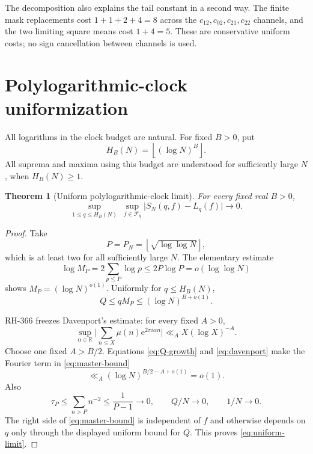 \documentclass[11pt]{article}
\newtheorem{theorem}{Theorem}[section]
\theoremstyle{definition}
\theoremstyle{remark}
\newcommand{\mob}{\mu}
\newcommand{\Fcal}{\mathcal F}
\newcommand{\e}{\mathrm e}
\newcommand{\abs}[1]{\lvert#1\rvert}
\begin{document}
The decomposition also explains the tail constant in a second way.  The
finite mask replacements cost $1+1+2+4=8$ across the
$c_{12},c_{02},c_{21},c_{22}$ channels, and the two limiting square means
cost $1+4=5$.  These are conservative uniform costs; no sign cancellation
between channels is used.

\section{Polylogarithmic-clock uniformization}

All logarithms in the clock budget are natural.  For fixed $B>0$, put
\begin{equation}
                    H_B(N)=\left\lfloor(\log N)^B\right\rfloor.
 \label{eq:clock-budget}
\end{equation}
All suprema and maxima using this budget are understood for sufficiently
large $N$, when $H_B(N)\ge1$.

\begin{theorem}[Uniform polylogarithmic-clock limit]
\label{thm:uniform}
For every fixed real $B>0$,
\begin{equation}
 \boxed{
 \sup_{1\le q\le H_B(N)}\ \sup_{f\in\Fcal_q}
       \abs{S_N(q,f)-L_q(f)}\longrightarrow0.}
 \label{eq:uniform-limit}
\end{equation}
\end{theorem}

\begin{proof}
Take
\begin{equation}
                   P=P_N=\left\lfloor\sqrt{\log\log N}\right\rfloor,
 \label{eq:P-choice}
\end{equation}
which is at least two for all sufficiently large $N$.  The elementary
estimate
\begin{equation}
 \log M_P=2\sum_{p\le P}\log p\le2P\log P=o(\log\log N)
 \label{eq:M-growth}
\end{equation}
shows $M_P=(\log N)^{o(1)}$.  Uniformly for $q\le H_B(N)$,
\begin{equation}
               Q\le qM_P\le(\log N)^{B+o(1)}.
 \label{eq:Q-growth}
\end{equation}

RH-366 freezes Davenport's estimate: for every fixed $A>0$,
\begin{equation}
 \sup_{\alpha\in\mathbb R}
 \abs{\sum_{n\le X}\mob(n)\e^{2\pi i\alpha n}}
 \ll_A X(\log X)^{-A}.
 \label{eq:davenport}
\end{equation}
Choose one fixed $A>B/2$.  Equations \eqref{eq:Q-growth} and
\eqref{eq:davenport} make the Fourier term in
\eqref{eq:master-bound}
\[
                \ll_A(\log N)^{B/2-A+o(1)}=o(1).
\]
Also
\[
 \tau_P\le\sum_{n>P}n^{-2}\le\frac1{P-1}\longrightarrow0,
 \qquad Q/N\longrightarrow0,
 \qquad 1/N\longrightarrow0.
\]
The right side of \eqref{eq:master-bound} is independent of $f$ and
otherwise depends on $q$ only through the displayed uniform bound for $Q$.
This proves \eqref{eq:uniform-limit}.
\end{proof}
\end{document}
